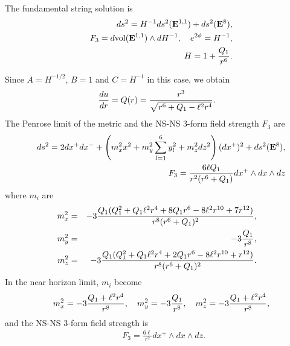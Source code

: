\documentclass[a4paper,12pt]{article}
\begin{document}
\vspace{2mm}
\vspace{1mm}

The fundamental string solution is
\cite{DaGiHaRu}
\begin{eqnarray}
&&ds^2=H^{-1}ds^2({\bf E}^{1,1})+ ds^2({\bf E}^{8}), \nonumber \\
&&F_{3}=d{\rm vol}({\bf E}^{1,1})\wedge dH^{-1}, \quad
e^{2\phi}=H^{-1},
\nonumber \\
&&H=1+\frac{Q_1}{r^6}.
\end{eqnarray}

Since $A=H^{-1/2}$,  $B=1$ and $C=H^{-1}$ in this case, we obtain
\begin{eqnarray}
{du\over dr}=
Q(r)={r^3\over\sqrt{r^6+Q_{1}-\ell^2 r^4}}.
\label{QF1} 
\end{eqnarray}
The Penrose limit of the metric and the NS-NS $3$-form field strength $F_3$
are
\begin{eqnarray}
&&ds^2=2dx^+dx^-+\left(
m_x^2x^2 +m_y^2\sum_{l=1}^{6}y_{l}^2
+m_z^2dz^2
\right)(dx^+)^2
+ds^2({\bf E}^{8}),\nonumber \\
&&
F_{3}= \frac{6\ell Q_1}{r^2(r^6+Q_1)}
dx^+\wedge dx\wedge dz
\end{eqnarray}
where $m_i$ are
\begin{eqnarray}
m^{2}_{x}&=& -3 {Q_{1}(Q_{1}^2+Q_{1}\ell^2 r^4+8Q_{1}r^6-8\ell^2 r^{10}+
7r^{12})
\over r^8 (r^6+Q_{1})^2},  \nonumber\\
m^2_{y}&=& -3{Q_{1}\over r^8},\nonumber\\
m^{2}_{z}&=&-3 {Q_{1}(Q_{1}^2+Q_{1}\ell^2 r^4+2Q_{1}r^6-8\ell^2 r^{10}+r^{12})
\over r^8 (r^6+Q_{1})^2}.
\label{eq:F1mass}
\end{eqnarray}
In the  near horizon limit, $m_i$ become
\begin{eqnarray}
&&m^{2}_{x}= -3 {Q_{1}+\ell^2 r^4 \over r^8 },\quad
m^{2}_{y}= -3 {Q_{1}\over r^8},\quad
m^{2}_{z}= -3 {Q_{1}+\ell^2 r^4 \over r^8 },
\end{eqnarray}
and the NS-NS $3$-form field strength is
\begin{eqnarray}
&& F_3=\frac{6\ell}{r^2}dx^+\wedge dx\wedge dz.
\end{eqnarray}



\vspace{2mm}
\vspace{1mm}
\end{document}
